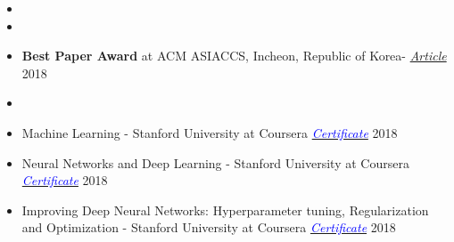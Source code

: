 
\begin{itemize}[noitemsep,topsep=0pt]
	\item {}
	\item {}
	\item \textbf{Best Paper Award} at ACM ASIACCS, Incheon, Republic of Korea- \href{https://www.bu.edu/eng/2018/08/14/best-paper-award-asia-conference-on-computer-and-communication-security-2018/}{ \textit{Article}} 2018
	\item {}
	\item Machine Learning - Stanford University at Coursera  \href{https://www.coursera.org/account/accomplishments/verify/U5YHWN3XSAQU}{\textit{\textcolor{blue}{Certificate}}} 2018
	\item Neural Networks and Deep Learning - Stanford University at Coursera \href{https://www.coursera.org/account/accomplishments/certificate/ZU26W977NR9P}{\textit{\textcolor{blue}{Certificate}}} 2018\\
	\item Improving Deep Neural Networks: Hyperparameter tuning, Regularization and Optimization - Stanford University at Coursera \href{https://www.coursera.org/account/accomplishments/certificate/U5YHWN3XSAQU}{\textit{\textcolor{blue}{Certificate}}} 2018\\
\end{itemize}